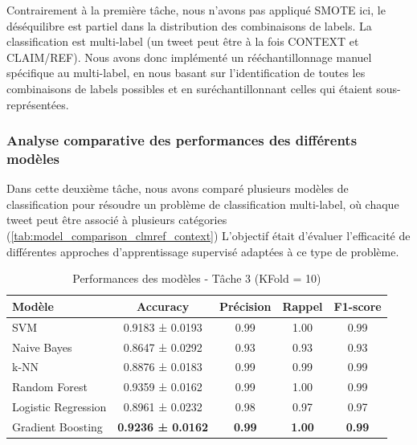 Contrairement à la première tâche, nous n’avons pas appliqué SMOTE ici, le déséquilibre est partiel dans la distribution des combinaisons de labels.
La classification est multi-label (un tweet peut être à la fois CONTEXT et CLAIM/REF).
Nous avons donc implémenté un rééchantillonnage manuel spécifique au multi-label, en nous basant sur l’identification de toutes les combinaisons de labels possibles et en suréchantillonnant celles qui étaient sous-représentées.

\subsubsection{Analyse comparative des performances des différents modèles}
Dans cette deuxième tâche, nous avons comparé plusieurs modèles de classification pour résoudre un problème de classification multi-label, où chaque tweet peut être associé à plusieurs catégories (\autoref{tab:model_comparison_clmref_context})
L’objectif était d’évaluer l’efficacité de différentes approches d’apprentissage supervisé adaptées à ce type de problème.

\begin{table}[H]
    \centering
    \caption{Performances des modèles - Tâche 3 (KFold = 10)}
    \begin{tabular}{lcccc}
        \toprule
        Modèle & Accuracy & Précision & Rappel & F1-score \\
        \midrule
        SVM & 0.9183 ± 0.0193 & 0.99 & 1.00 & 0.99 \\
        Naive Bayes & 0.8647 ± 0.0292 & 0.93 & 0.93 & 0.93 \\
        k-NN & 0.8876 ± 0.0183 & 0.99 & 0.99 & 0.99 \\
        Random Forest & 0.9359 ± 0.0162 & 0.99 & 1.00 & 0.99 \\
        Logistic Regression & 0.8961 ± 0.0232 & 0.98 & 0.97 & 0.97 \\
        Gradient Boosting & \textbf{0.9236 ± 0.0162} & \textbf{0.99} & \textbf{1.00} & \textbf{0.99} \\
        \bottomrule
    \end{tabular}\label{tab:model_comparison_clmref_context}
\end{table}

